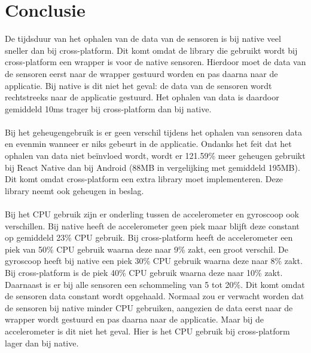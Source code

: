 \section{Conclusie}
De tijdsduur van het ophalen van de data van de sensoren is bij native veel sneller dan bij cross-platform.
Dit komt omdat de library die gebruikt wordt bij cross-platform een wrapper is voor de native sensoren.
Hierdoor moet de data van de sensoren eerst naar de wrapper gestuurd worden en pas daarna naar de applicatie.
Bij native is dit niet het geval: de data van de sensoren wordt rechtstreeks naar de applicatie gestuurd.
Het ophalen van data is daardoor gemiddeld 10ms trager bij cross-platform dan bij native.
\\\\
Bij het geheugengebruik is er geen verschil tijdens het ophalen van sensoren data en evenmin wanneer er 
niks gebeurt in de applicatie. Ondanks het feit dat het ophalen van data niet beïnvloed 
wordt, wordt er 121.59\% meer geheugen gebruikt bij React Native dan 
bij Android (88MB in vergelijking met gemiddeld 195MB). Dit komt omdat cross-platform een extra 
library moet implementeren. Deze library neemt ook geheugen in beslag.
\\\\
Bij het CPU gebruik zijn er onderling tussen de accelerometer en gyroscoop ook verschillen. Bij native 
heeft de accelerometer geen piek maar blijft deze constant op gemiddeld 23\% CPU gebruik. Bij cross-platform heeft
de accelerometer een piek van 50\% CPU gebruik waarna deze naar 9\% zakt, een groot verschil. 
De gyroscoop heeft bij native een piek 30\% CPU gebruik waarna deze naar 8\% zakt. Bij cross-platform
is de piek 40\% CPU gebruik waarna deze naar 10\% zakt. Daarnaast is er bij alle sensoren een schommeling van 5 tot 20\%. 
Dit komt omdat de sensoren data constant wordt opgehaald. Normaal zou er verwacht worden dat de sensoren bij native 
minder CPU gebruiken, aangezien de data eerst naar de wrapper wordt gestuurd en pas daarna naar de applicatie. Maar bij 
de accelerometer is dit niet het geval. Hier is het CPU gebruik bij cross-platform lager dan bij native.
\\\\
